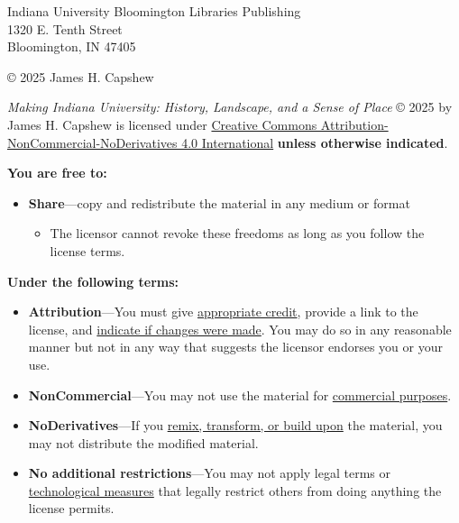 \begin{flushleft}
\thispagestyle{empty}
\begin{small}
Indiana University Bloomington Libraries Publishing\\
1320 E. Tenth Street\\
Bloomington, IN 47405
\vspace{2mm}

© 2025 James H. Capshew

\vspace{2mm}
\ccbyncnd

\textit{Making Indiana University: History, Landscape, and a Sense of Place} © 2025 by James H. Capshew is licensed under \href{https://creativecommons.org/licenses/by-nc-nd/4.0/?ref=chooser-v1}{Creative Commons Attribution-NonCommercial-NoDerivatives 4.0 International} \textbf{unless otherwise indicated}.  

\textbf{You are free to:}
\begin{itemize}
\tightlist
\item \textbf{Share}---copy and redistribute the material in any medium or format
  \begin{itemize}
    \item The licensor cannot revoke these freedoms as long as you follow the license terms.
  \end{itemize}
\end{itemize}

\textbf{Under the following terms:}
\begin{itemize}
\tightlist
\item \textbf{Attribution}---You must give \href{https://creativecommons.org/licenses/by-nc-nd/4.0/?ref=chooser-v1#ref-appropriate-credit}{appropriate credit}, provide a link to the license, and \href{https://creativecommons.org/licenses/by-nc-nd/4.0/?ref=chooser-v1#ref-indicate-changes}{indicate if changes were made}. You may do so in any reasonable manner but not in any way that suggests the licensor endorses you or your use.\\
\item \textbf{NonCommercial}---You may not use the material for \href{https://creativecommons.org/licenses/by-nc-nd/4.0/?ref=chooser-v1#ref-commercial-purposes}{commercial purposes}.
\item \textbf{NoDerivatives}---If you \href{https://creativecommons.org/licenses/by-nc-nd/4.0/?ref=chooser-v1#ref-some-kinds-of-mods}{remix, transform, or build upon} the material, you may not distribute the modified material.
\item \textbf{No additional restrictions}---You may not apply legal terms or \href{https://creativecommons.org/licenses/by-nc-nd/4.0/?ref=chooser-v1#ref-technological-measures}{technological measures} that legally restrict others from doing anything the license permits.
\end{itemize}


\end{small}
\end{flushleft}
